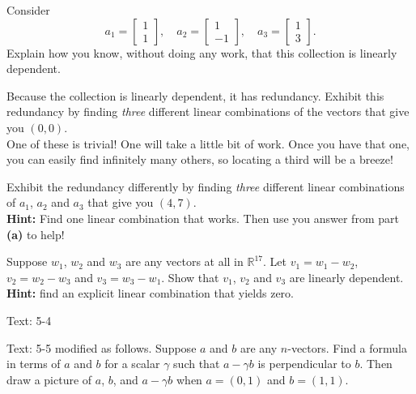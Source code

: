 \documentclass[minion]{homework}
\newcommand{\Reals}{\mathbb{R}}
\begin{document}
\begin{problems}
    \begin{subproblems}
        \item Consider
        \[
        a_1= \begin{bmatrix} 1\\ 1\end{bmatrix},\quad
        a_2= \begin{bmatrix} 1\\ -1\end{bmatrix},\quad
        a_3= \begin{bmatrix} 1\\ 3 \end{bmatrix}.
        \]
    Explain how you know, without doing any work, that this collection
    is linearly dependent.
    \item Because the collection is linearly dependent, it has redundancy.
    Exhibit this redundancy by finding \emph{three} different linear combinations of 
    the vectors that give you $(0,0)$. \\One of these is trivial!  One
    will take a little bit of work.  Once you have that one, you can easily 
    find infinitely many others, so locating a third will be a breeze!
    \item Exhibit the redundancy differently by finding \emph{three} different 
    linear combinations of $a_1$, $a_2$ and $a_3$ that give you $(4, 7)$.\\
    \textbf{Hint:} Find one linear combination that works.  Then use you answer
    from part \textbf{(a)} to help!
\end{subproblems}

    \problem Suppose $w_1$, $w_2$ and $w_3$ are any vectors at all in $\Reals^{17}$.
    Let $v_1 = w_1-w_2$, $v_2=w_2 - w_3$ and $v_3 = w_3 - w_1$.  Show that
    $v_1$, $v_2$ and $v_3$ are linearly dependent.  \textbf{Hint:} find an explicit
    linear combination that yields zero.

    \problem Text: 5-4

    \problem Text: 5-5 modified as follows.  Suppose $a$ and $b$
    are any $n$-vectors.  Find a formula in terms of $a$ and $b$ 
    for a scalar $\gamma$ such that $a-\gamma b$ is perpendicular to $b$.
    Then draw a picture of $a$, $b$, and $a-\gamma b$ when
    $a=(0,1)$ and $b=(1,1)$.

\end{problems}
\end{document}
